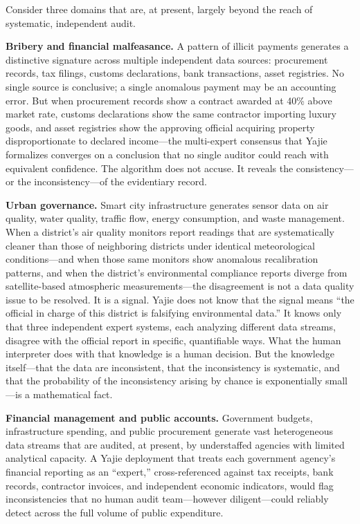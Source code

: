 \documentclass[12pt,a4paper]{ctexart}
\theoremstyle{definition}
\theoremstyle{remark}
\begin{document}
Consider three domains that are, at present, largely beyond the reach of systematic, independent audit.

\textbf{Bribery and financial malfeasance.} A pattern of illicit payments generates a distinctive signature across multiple independent data sources: procurement records, tax filings, customs declarations, bank transactions, asset registries. No single source is conclusive; a single anomalous payment may be an accounting error. But when procurement records show a contract awarded at 40\% above market rate, customs declarations show the same contractor importing luxury goods, and asset registries show the approving official acquiring property disproportionate to declared income—the multi-expert consensus that Yajie formalizes converges on a conclusion that no single auditor could reach with equivalent confidence. The algorithm does not accuse. It reveals the consistency—or the inconsistency—of the evidentiary record.

\textbf{Urban governance.} Smart city infrastructure generates sensor data on air quality, water quality, traffic flow, energy consumption, and waste management. When a district's air quality monitors report readings that are systematically cleaner than those of neighboring districts under identical meteorological conditions—and when those same monitors show anomalous recalibration patterns, and when the district's environmental compliance reports diverge from satellite-based atmospheric measurements—the disagreement is not a data quality issue to be resolved. It is a signal. Yajie does not know that the signal means ``the official in charge of this district is falsifying environmental data.'' It knows only that three independent expert systems, each analyzing different data streams, disagree with the official report in specific, quantifiable ways. What the human interpreter does with that knowledge is a human decision. But the knowledge itself—that the data are inconsistent, that the inconsistency is systematic, and that the probability of the inconsistency arising by chance is exponentially small—is a mathematical fact.

\textbf{Financial management and public accounts.} Government budgets, infrastructure spending, and public procurement generate vast heterogeneous data streams that are audited, at present, by understaffed agencies with limited analytical capacity. A Yajie deployment that treats each government agency's financial reporting as an ``expert,'' cross-referenced against tax receipts, bank records, contractor invoices, and independent economic indicators, would flag inconsistencies that no human audit team—however diligent—could reliably detect across the full volume of public expenditure.
\end{document}
